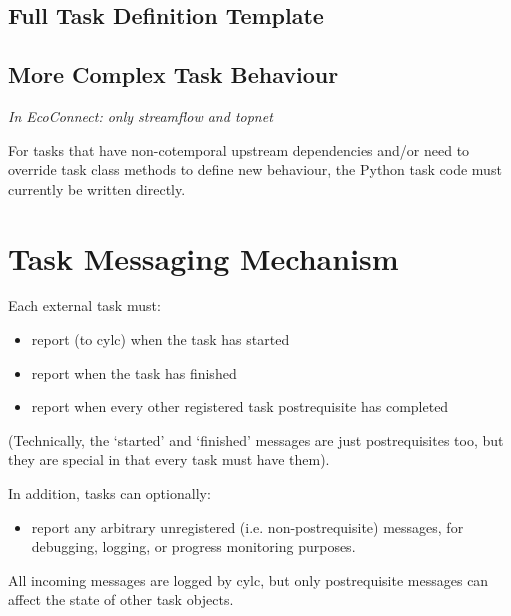 \documentclass[11pt,a4paper]{article}
\begin{document}
\lstset{language=bash, numbers=left}

{
\color{Magenta}

}

\subsection{Full Task Definition Template}

\lstset{language=sh, numbers=left}

{
\color{Magenta}

}

\subsection{More Complex Task Behaviour}

\textit{In EcoConnect: only streamflow and topnet}

For tasks that have non-cotemporal upstream dependencies and/or need to  
override task class methods to define new behaviour, the Python task
code must currently be written directly. 

\section{Task Messaging Mechanism}

Each external task must:

\begin{itemize}
\item report (to cylc) when the task has started
\item report when the task has finished
\item report when every other registered task postrequisite has
completed
\end{itemize}

(Technically, the `started' and `finished' messages are just
postrequisites too, but they are special in that every task
must have them).

In addition, tasks can optionally:

\begin{itemize}
\item report any arbitrary unregistered (i.e. non-postrequisite)
messages, for debugging, logging, or progress monitoring purposes.
\end{itemize}

All incoming messages are logged by cylc, but only postrequisite
messages can affect the state of other task objects.
\end{document}
